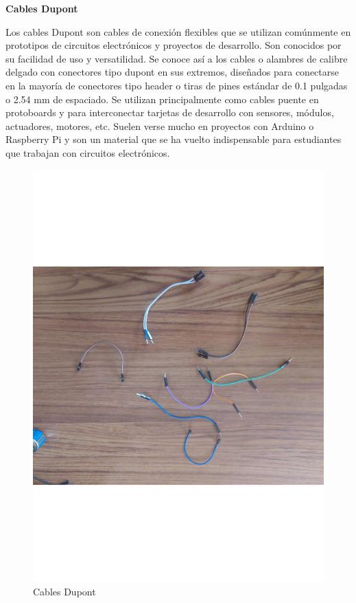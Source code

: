 \textbf{Cables Dupont}

Los cables Dupont son cables de conexión flexibles que se utilizan comúnmente en prototipos de circuitos electrónicos y proyectos de desarrollo. Son conocidos por su facilidad de uso y versatilidad.
Se conoce así a los cables o alambres de calibre delgado con conectores tipo dupont en sus extremos, diseñados para conectarse en la mayoría de conectores tipo header o tiras de pines estándar de 0.1 pulgadas o 2.54 mm de espaciado.
Se utilizan principalmente como cables puente en protoboards y para interconectar tarjetas de desarrollo con sensores, módulos, actuadores, motores, etc. Suelen verse mucho en proyectos con Arduino o Raspberry Pi y son un material que se ha vuelto indispensable para estudiantes que trabajan con circuitos electrónicos.\cite{CablesDupont}

 \begin{figure}[H]
        \centering
        \includegraphics[trim = {30mm 30mm 30mm 30mm},clip,scale=0.2]{10/Img/cablesDupont.pdf}
        \caption{Cables Dupont}
        \label{Cables Dupont}
\end{figure}

